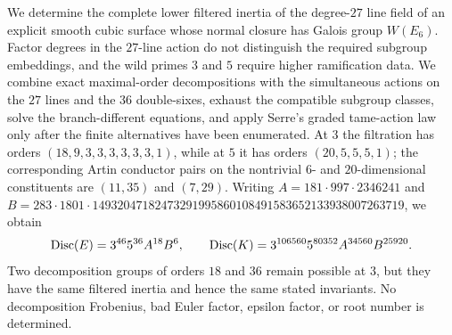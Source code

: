 We determine the complete lower filtered inertia of the degree-$27$ line
field of an explicit smooth cubic surface whose normal closure has Galois
group $W(E_6)$.  Factor degrees in the $27$-line action do not distinguish
the required subgroup embeddings, and the wild primes $3$ and $5$ require
higher ramification data.  We combine exact maximal-order decompositions
with the simultaneous actions on the $27$ lines and the $36$ double-sixes,
exhaust the compatible subgroup classes, solve the branch-different
equations, and apply Serre's graded tame-action law only after the finite
alternatives have been enumerated.  At $3$ the filtration has orders
$(18,9,3,3,3,3,3,3,1)$, while at $5$ it has orders $(20,5,5,5,1)$; the
corresponding Artin conductor pairs on the nontrivial $6$- and
$20$-dimensional constituents are $(11,35)$ and $(7,29)$.  Writing
$A=181\cdot997\cdot2346241$ and
$B=283\cdot1801\cdot
14932047182473291995860108491583652133938007263719$, we obtain
\[
 \operatorname{Disc}(E)=3^{46}5^{36}A^{18}B^6,\qquad
 \operatorname{Disc}(K)=3^{106560}5^{80352}A^{34560}B^{25920}.
\]
Two decomposition groups of orders $18$ and $36$ remain possible at $3$,
but they have the same filtered inertia and hence the same stated
invariants.  No decomposition Frobenius, bad Euler factor, epsilon factor,
or root number is determined.
